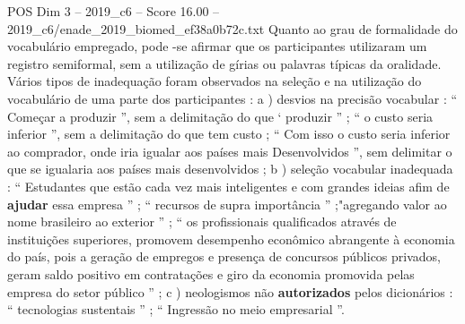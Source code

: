 \begin{textsample}{POS Dim 3 – 2019\_c6 – Score 16.00 – 2019\_c6/enade\_2019\_biomed\_ef38a0b72c.txt}
Quanto ao grau de formalidade do vocabulário empregado, pode -se afirmar que os participantes utilizaram um registro semiformal, sem a utilização de gírias ou palavras típicas da oralidade.
Vários tipos de inadequação foram observados na seleção e na utilização do vocabulário de uma parte dos participantes : a ) desvios na precisão vocabular : “ Começar a produzir ”, sem a delimitação do que ‘ produzir ” ; “ o custo seria inferior ”, sem a delimitação do que tem custo ; “ Com isso o custo seria inferior ao comprador, onde iria igualar aos países mais Desenvolvidos ”, sem delimitar o que se igualaria aos países mais desenvolvidos ; b ) seleção vocabular inadequada : “ Estudantes que estão cada vez mais inteligentes e com grandes ideias afim de \textbf{ajudar} essa empresa ” ; “ recursos de supra importância ” ;"agregando valor ao nome brasileiro ao exterior ” ; “ os profissionais qualificados através de instituições superiores, promovem desempenho econômico abrangente à economia do país, pois a geração de empregos e presença de concursos públicos privados, geram saldo positivo em contratações e giro da economia promovida pelas empresa do setor público ” ; c ) neologismos não \textbf{autorizados} pelos dicionários : “ tecnologias sustentais ” ; “ Ingressão no meio empresarial ”.

\end{textsample}
